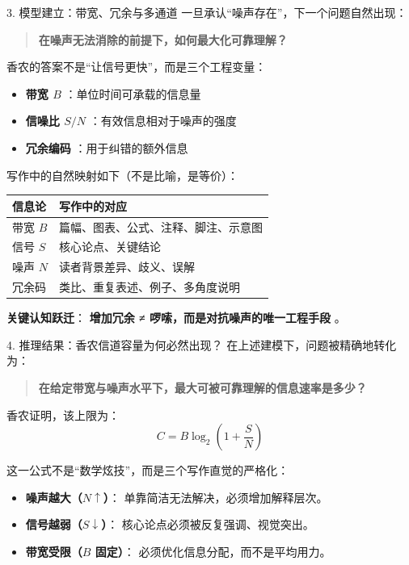 \documentclass[11pt, a4paper]{ctexart}
\newcommand{\lowfreq}[1]{%
	{\Large\bfseries\color{red!60!black} #1}%
}
\begin{document}
\begin{mathbox}{3. 模型建立：带宽、冗余与多通道}
	一旦承认“噪声存在”，下一个问题自然出现：
	
	\begin{quote}
		\textbf{在噪声无法消除的前提下，如何最大化可靠理解？}
	\end{quote}
	
	香农的答案不是“让信号更快”，而是三个工程变量：
	
	\begin{itemize}
		\item \lowfreq{带宽 $B$}：单位时间可承载的信息量  
		\item \lowfreq{信噪比 $S/N$}：有效信息相对于噪声的强度  
		\item \lowfreq{冗余编码}：用于纠错的额外信息
	\end{itemize}
	
	\vspace{0.5em}
	写作中的自然映射如下（不是比喻，是等价）：
	
	\begin{center}
		\begin{tabular}{l|l}
			\toprule
			\textbf{信息论} & \textbf{写作中的对应} \\
			\midrule
			带宽 $B$ & 篇幅、图表、公式、注释、脚注、示意图 \\
			信号 $S$ & 核心论点、关键结论 \\
			噪声 $N$ & 读者背景差异、歧义、误解 \\
			冗余码 & 类比、重复表述、例子、多角度说明 \\
			\bottomrule
		\end{tabular}
	\end{center}
	
	\textbf{关键认知跃迁}：  
	\lowfreq{增加冗余 ≠ 啰嗦，而是对抗噪声的唯一工程手段}。
\end{mathbox}


\begin{mathbox}{4. 推理结果：香农信道容量为何必然出现？}
	在上述建模下，问题被精确地转化为：
	
	\begin{quote}
		\textbf{在给定带宽与噪声水平下，最大可被可靠理解的信息速率是多少？}
	\end{quote}
	
	香农证明，该上限为：
	$$
	C = B \log_2\!\left(1 + \frac{S}{N}\right)
	$$
	
	\vspace{0.5em}
	这一公式不是“数学炫技”，而是三个写作直觉的严格化：
	
	\begin{itemize}
		\item \textbf{噪声越大（$N \uparrow$）}：  
		单靠简洁无法解决，必须增加解释层次。
		
		\item \textbf{信号越弱（$S \downarrow$）}：  
		核心论点必须被反复强调、视觉突出。
		
		\item \textbf{带宽受限（$B$ 固定）}：  
		必须优化信息分配，而不是平均用力。
	\end{itemize}
\end{mathbox}
\end{document}
